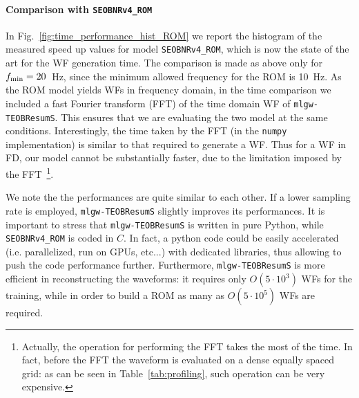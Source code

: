 \paragraph{Comparison with \texttt{SEOBNRv4\_ROM}}
In Fig.~\ref{fig:time_performance_hist_ROM} we report the histogram of the measured speed up 
values for model \texttt{SEOBNRv4\_ROM}, which is now the state of the art for the WF generation time.
The comparison is made as above only for $f_{\rm min} = 20$~Hz, since the minimum allowed frequency
for the ROM is 10~Hz. As the ROM model yields WFs in frequency domain, in the time comparison 
we included a fast Fourier transform (FFT) of the time domain WF of \texttt{mlgw-TEOBResumS}. 
This ensures that we are evaluating the two model at the same conditions.
Interestingly, the time taken by the FFT (in the \texttt{numpy}
implementation) is similar to that required to generate a WF. Thus for
a WF in FD, our model cannot be substantially faster, due to the
limitation imposed by the FFT~\footnote{Actually, the operation for performing 
the FFT takes the most of the time. In fact,  before the FFT the waveform 
is evaluated on a dense equally spaced grid: as can be seen in 
Table~\ref{tab:profiling}, such operation can be very expensive.}.

We note the the performances are quite similar to each other.
If a lower sampling rate is employed, \texttt{mlgw-TEOBResumS} 
slightly improves its performances. It is important to stress 
that \texttt{mlgw-TEOBResumS}  is written in pure Python, 
while \texttt{SEOBNRv4\_ROM} is coded in $C$.
In fact, a python code could be easily accelerated (i.e. parallelized, run on GPUs, etc...) 
with dedicated libraries, thus allowing to push the code performance further.
%
Furthermore, \texttt{mlgw-TEOBResumS} is more efficient in reconstructing 
the waveforms: it requires only $O(5\cdot 10^3)$ WFs for the training,
while in order to build a ROM as many as $O(5\cdot 10^5)$ WFs are
required. 

